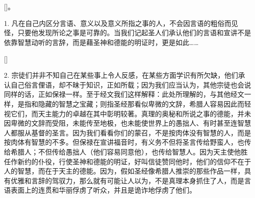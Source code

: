 
\section{}

[]。\par

1. 凡在自己内区分言语、意义以及意义所指之事的人，不会因言语的粗俗而见怪，只要他发现所论之事是可靠的。当我们记起圣人们承认他们的言语和宣讲不是依靠智慧动听的言辞，而是藉圣神和德能的明证时，更是如此……\par

[]\par

2. 宗徒们并非不知自己在某些事上令人反感，在某些方面学识有所欠缺，他们承认自己俗言俚语，却不昧于知识，正如所载；因为我们应当认为，其他宗徒也会说同样的话，正如保禄一样。至于经文我们这样解释：此处所理解的，与其他经文一样，是指和隐藏的智慧之宝藏；则指圣经那看似卑微的文辞，希腊人容易因此而轻视它们，而天主能力的卓越在其中彰明较著。真理的奥秘和所说之事的德能，并未因卑微的文辞而受阻，未能传至地极，也未能使世界上的愚拙人、有时甚至连智慧人都服从基督的圣言。因为我们看看你们的蒙召，不是按肉体没有智慧的人，而是按肉体有智慧的不多。但保禄在宣讲福音时，有义务不但将圣言传给野蛮人，也传给希腊人；不但传给愚拙人（他们容易同意他），也传给智慧人。因为天主使他胜任作新约的仆役，行使圣神和德能的明证，好叫信徒赞同他时，他们的信仰不在于人的智慧，而在于天主的德能。因为，假如圣经像希腊人推崇的那些作品一样，具有优雅和言辞的驾驭力，那么就有可能让人以为，不是真理本身抓住了人，而是言语表面上的连贯和华丽俘虏了听众，并且是诡诈地俘虏了他们。\par



\section{}

